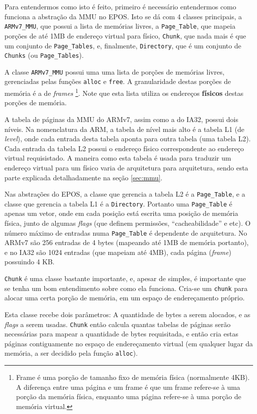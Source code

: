 Para entendermos como isto é feito, primeiro é necessário entendermos como funciona a abstração da MMU no EPOS. Isto se dá com 4 classes principais, a \verb+ARMv7_MMU+, que possui a lista de memórias livres, a \verb+Page_Table+, que mapeia porções de até 1MB de endereço virtual para físico, \verb+Chunk+, que nada mais é que um conjunto de \verb+Page_Tables+, e, finalmente, \verb+Directory+, que é um conjunto de \verb+Chunks+ (ou \verb+Page_Tables+).

A classe \verb+ARMv7_MMU+ possui uma uma lista de porções de memórias livres, gerenciadas pelas funções \verb+alloc+ e \verb+free+. A granularidade destas porções de memória é a de \emph{frames}
\footnote{Frame é uma porção de tamanho fixo de memória física (normalmente 4KB). A diferença entre uma página e um frame é que um frame refere-se à uma porção da memória física, enquanto uma página refere-se à uma porção de memória virtual.}.
Note que esta lista utiliza os endereços \textbf{físicos} destas porções de memória.

A tabela de páginas da MMU do ARMv7, assim como a do IA32, possui dois níveis. Na nomenclatura da ARM, a tabela de nível mais alto é a tabela L1 (de \emph{level}), onde cada entrada desta tabela aponta para outra tabela (uma tabela L2).
Cada entrada da tabela L2 possui o endereço físico correspondente ao endereço virtual requisistado. A maneira como esta tabela é usada para traduzir um endereço virtual para um físico varia de arquitetura para arquitetura, sendo esta parte explicada detalhadamente na seção \ref{sec:mmu}.

Nas abstrações do EPOS, a classe que gerencia a tabela L2 é a \verb+Page_Table+, e a classe que gerencia a tabela L1 é a \verb+Directory+. Portanto uma \verb+Page_Table+ é apenas um vetor, onde em cada posição está escrita uma posição de memória física, junto de algumas \emph{flags} (que definem permissões, ``cacheabilidade'' e etc). O número máximo de entradas numa \verb+Page_Table+ é dependente de arquitetura. No ARMv7 são 256 entradas de 4 bytes (mapeando até 1MB de memória portanto), e no IA32 são 1024 entradas (que mapeiam até 4MB), cada página (\emph{frame}) possuindo 4 KB.

\verb+Chunk+ é uma classe bastante importante, e, apesar de simples, é importante que se tenha um bom entendimento sobre como ela funciona.
Cria-se um \verb+chunk+ para alocar uma certa porção de memória, em um espaço de endereçamento próprio. 

Esta classe recebe dois parâmetros: A quantidade de bytes a serem alocados, e as \emph{flags} a serem usadas. \verb+Chunk+ então calcula quantas tabelas de páginas serão necessárias para mapear a quantidade de bytes requisitada, e então cria estas páginas contiguamente no espaço de endereçamento virtual (em qualquer lugar da memória, a ser decidido pela função \verb+alloc+).

